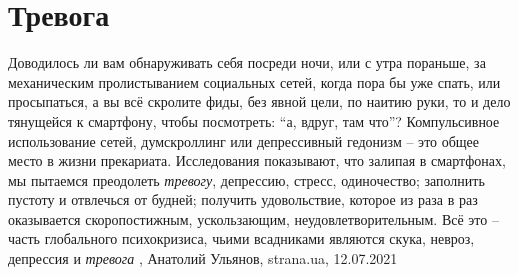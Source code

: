  
 
 
 
 
\chapter{Тревога}
\label{sec:slova.trevoga}


Доводилось ли вам обнаруживать себя посреди ночи, или с утра пораньше, за
механическим пролистыванием социальных сетей, когда пора бы уже спать, или
просыпаться, а вы всё скролите фиды, без явной цели, по наитию руки, то и дело
тянущейся к смартфону, чтобы посмотреть: \enquote{а, вдруг, там что}?
Компульсивное использование сетей, думскроллинг или депрессивный гедонизм – это
общее место в жизни прекариата. Исследования показывают, что залипая в
смартфонах, мы пытаемся преодолеть \emph{тревогу}, депрессию, стресс, одиночество;
заполнить пустоту и отвлечься от будней; получить удовольствие, которое из раза
в раз оказывается скоропостижным, ускользающим, неудовлетворительным.
Всё это – часть глобального психокризиса, чьими всадниками являются скука,
невроз, депрессия и \emph{тревога}
, 
Анатолий Ульянов, strana.ua, 12.07.2021

